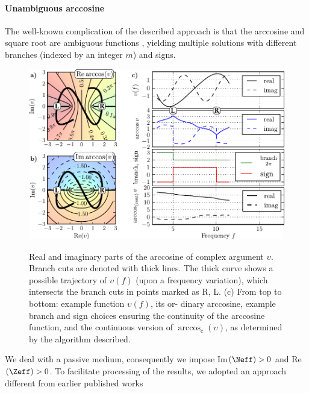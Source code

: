 \paragraph{Unambiguous arccosine} %
The well-known complication of the described approach is that the arccosine and square root are ambiguous functions \cite{simovski2009material}, yielding multiple solutions with different branches (indexed by an integer $m$) and signs. 

\begin{figure} \centering \caption{ Real and imaginary parts of the arccosine of complex argument $\upsilon$. Branch cuts are denoted with thick lines. The thick curve shows a possible trajectory of  $\upsilon(f)$ (upon a frequency variation), which intersects the branch cuts in points marked as R, L. (c) From top to bottom: example function  $\upsilon(f)$, its or- dinary arccosine, example branch and sign choices ensuring the continuity of the arccosine function, and the continuous version of $\arccos_{\mathrm{c}}(\upsilon)$, as determined by the algorithm described.} \includegraphics[width=\textwidth]{img/continuous_arccos/continuous_arccos_new.pdf} \label{fg_arccos}
\end{figure}
We deal with a passive medium, consequently we impose Im$(\Neff)>0$ and Re$(\Zeff)>0$. %
To facilitate processing of the results, we adopted an approach different from earlier published works \cite{smith2002determination,chen2004robust}
